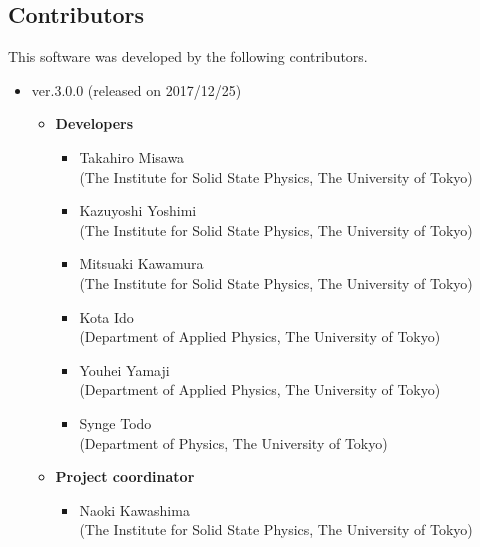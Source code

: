 \subsection{Contributors}
\label{subsec:contributors}
This software was developed by the following contributors.
\begin{itemize}
\item{ver.3.0.0 (released on 2017/12/25)}
\begin{itemize}
	\item{\bf Developers}
	\begin{itemize}
	\item{Takahiro Misawa \\(The Institute for Solid State Physics, The University of Tokyo)}
	\item{Kazuyoshi Yoshimi\\ (The Institute for Solid State Physics, The University of Tokyo)}
	\item{Mitsuaki Kawamura\\ (The Institute for Solid State Physics, The University of Tokyo)}
	\item{Kota Ido\\ (Department of Applied Physics, The University of Tokyo)}
	\item{Youhei Yamaji\\ (Department of Applied Physics, The University of Tokyo)}
	\item{Synge Todo\\ (Department of Physics, The University of Tokyo)}
	\end{itemize}
	\item{\bf Project coordinator}
	\begin{itemize}
	\item{Naoki Kawashima\\ (The Institute for Solid State Physics, The University of Tokyo)}
	\end{itemize}
\end{itemize}


\end{itemize}
